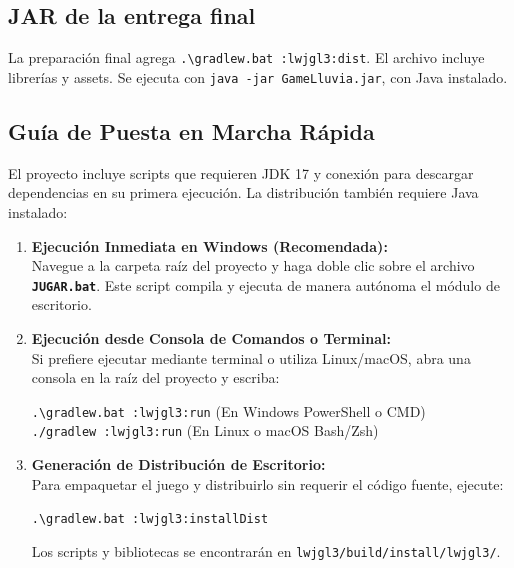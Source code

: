 \documentclass[11pt,a4paper]{article}
\begin{document}
\subsection*{JAR de la entrega final}
La preparación final agrega \texttt{.\textbackslash gradlew.bat :lwjgl3:dist}. El archivo  incluye librerías y assets. Se ejecuta con \texttt{java -jar GameLluvia.jar}, con Java instalado.
\subsection*{Guía de Puesta en Marcha Rápida}

El proyecto incluye scripts que requieren JDK 17 y conexión para descargar dependencias en su primera ejecución. La distribución también requiere Java instalado:

\begin{enumerate}[label=\textbf{\arabic*.}, itemsep=0.8em]
    \item \textbf{Ejecución Inmediata en Windows (Recomendada):}\\
    Navegue a la carpeta raíz del proyecto y haga doble clic sobre el archivo \textbf{\texttt{JUGAR.bat}}. Este script compila y ejecuta de manera autónoma el módulo de escritorio.

    \item \textbf{Ejecución desde Consola de Comandos o Terminal:}\\
    Si prefiere ejecutar mediante terminal o utiliza Linux/macOS, abra una consola en la raíz del proyecto y escriba:
    \begin{tcolorbox}[colback=NavyDark, colframe=CyanGlow, arc=1.5mm, boxrule=0.8pt, left=8pt, right=8pt, top=4pt, bottom=4pt]
        \color{CyanBright}\texttt{.\textbackslash gradlew.bat :lwjgl3:run} \quad \textcolor{white!70}{(En Windows PowerShell o CMD)}\\
        \color{CyanBright}\texttt{./gradlew :lwjgl3:run} \quad \textcolor{white!70}{(En Linux o macOS Bash/Zsh)}
    \end{tcolorbox}

    \item \textbf{Generación de Distribución de Escritorio:}\\
    Para empaquetar el juego y distribuirlo sin requerir el código fuente, ejecute:
    \begin{tcolorbox}[colback=NavyDark, colframe=CyanGlow, arc=1.5mm, boxrule=0.8pt, left=8pt, right=8pt, top=4pt, bottom=4pt]
        \color{CyanBright}\texttt{.\textbackslash gradlew.bat :lwjgl3:installDist}
    \end{tcolorbox}
    Los scripts y bibliotecas se encontrarán en \texttt{lwjgl3/build/install/lwjgl3/}.
\end{enumerate}
\end{document}

